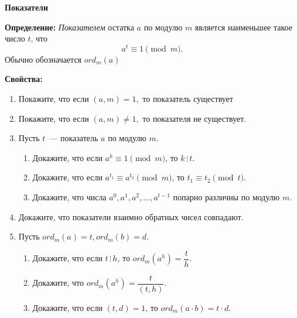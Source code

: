 \documentclass{article}
\begin{document}
\large
	
\begin{center}
	\textbf{Показатели}
\end{center}

\textbf{Определение:} \textit{Показателем} остатка $a$ по модулю $m$ является наименьшее такое число $t$, что $$a^t \equiv 1 \pmod m.$$ Обычно обозначается $ord_m(a)$



\textbf{Свойства:}  

\begin{enumerate}[label*=\protect\fbox{\arabic{enumi}}]
	
\item Покажите, что если $(a,m) = 1,$ то показатель существует

\item Покажите, что если $(a,m) \neq 1,$ то показателя не существует.

\item Пусть $t$~--- показатель $a$ по модулю $m$. 
\begin{enumerate}

\item Докажите, что если $a^{k} \equiv 1 \pmod m$, то $k \,\vdots\, t$.

\item Докажите, что если $a^{t_1} \equiv a^{t_2}  \pmod m$, то $t_1 \equiv t_2  \pmod t$.

\item Докажите, что числа $a^0, a^1, a^2, \dotsc , a^{t-1}$ попарно различны по модулю $m$.

\end{enumerate}

\item Докажите, что показатели взаимно обратных чисел совпадают.

\item Пусть $ord_m(a) = t,  ord_m(b) = d$. 
\begin{enumerate}
	
	\item Докажите, что если $t \,\vdots\, h$, то $ord_m (a^h) = \dfrac{t}{h}$.
	
	\item Докажите, что $ord_m (a^h) = \dfrac{t}{(t,h)}$.
	
	\item Докажите, что если $(t, d) = 1$, то $ord_m (a\cdot b) = t \cdot d$.
	
\end{enumerate}

\end{enumerate}
\end{document}
